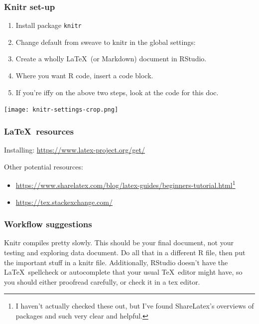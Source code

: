 \documentclass[dvipsnames]{beamer}\usepackage[]{graphicx}\usepackage[]{color}
\begin{document}
\begin{frame}
  \frametitle{Knitr set-up}
  
  \begin{multicols}{2}
  \begin{enumerate}
    \item Install package \texttt{knitr}
    \item Change default from sweave to knitr in the global settings:
    \item Create a wholly \LaTeX\ (or Markdown) document in RStudio.
    \item Where you want R code, insert a code block.
    \item If you're iffy on the above two steps, look at the code for this doc.
  \end{enumerate}
  
  \columnbreak
  
  \texttt{[image: knitr-settings-crop.png]}
  \end{multicols}
  
\end{frame}

%

\begin{frame}
  \frametitle{\LaTeX\ resources}
  
  Installing: \href{https://www.latex-project.org/get/}{\color{violet}https://www.latex-project.org/get/}
  \vspace{2em}
  
  Other potential resources:
  \begin{itemize}
    \item \href{https://www.sharelatex.com/blog/latex-guides/beginners-tutorial.html}{\color{violet}https://www.sharelatex.com/blog/latex-guides/beginners-tutorial.html}\footnote{I haven't actually checked these out, but I've found ShareLatex's overviews of packages and such very clear and helpful.}
    \item \href{https://tex.stackexchange.com/}{\color{violet}https://tex.stackexchange.com/}
  \end{itemize}
\end{frame}

%

\begin{frame}
  \frametitle{Workflow suggestions}
  
  Knitr compiles pretty slowly. This should be your final document, not your testing and exploring data document. Do all that in a different R file, then put the important stuff in a knitr file. Additionally, RStudio doesn't have the \LaTeX\ spellcheck or autocomplete that your usual \TeX\ editor might have, so you should either proofread carefully, or check it in a tex editor.
  
\end{frame}
\end{document}
